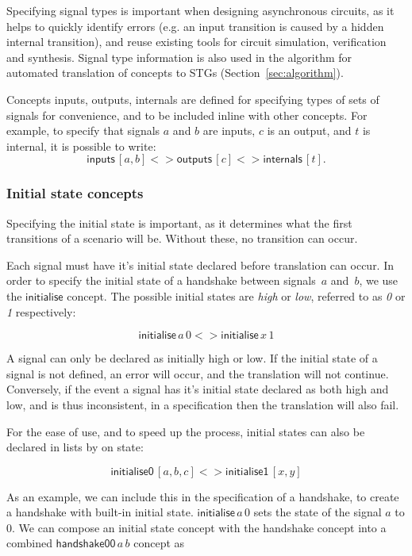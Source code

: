 \documentclass[british,conference,compsoc]{IEEEtran}
\begin{document}
\noindent Specifying signal types is important when designing asynchronous
circuits, as it helps to quickly identify errors (e.g. an input transition is
caused by a hidden internal transition), and reuse existing tools for circuit
simulation, verification and synthesis. Signal type information is also used
in the algorithm for automated translation of concepts to
STGs (Section~\ref{sec:algorithm}).

Concepts \textsf{inputs}, \textsf{outputs}, \textsf{internals} are defined for
specifying types of sets of signals for convenience, and to be included inline with other
concepts. For example, to specify
that signals $a$ and $b$ are inputs, $c$ is an output, and $t$ is internal, it
is possible to write:
\[
\mathsf{inputs}\,[a, b] <> \mathsf{outputs}\,[c] <>
\mathsf{internals}\,[t].
\]


\subsubsection{Initial state concepts\label{sub:initState}}

Specifying the initial state is important, as it determines what the first transitions
of a scenario will be. Without these, no transition can occur.

Each signal must have it's initial state declared before translation can occur. 
In order to specify the initial state of a handshake between signals~$a$
and~$b$, we use the $\mathsf{initialise}$ concept.
The possible initial states are \emph{high} or \emph{low}, referred to as \emph{0} 
or \emph{1} respectively:

\[
\mathsf{initialise}\,a\,0 <> \mathsf{initialise}\,x\, 1
\]

\noindent A signal can only be declared as initially high or low. If the initial state of a signal is 
not defined, an error will occur, and the translation will not continue. Conversely, 
if the event a signal has it's initial state declared as both high and low,
and is thus inconsistent, in a specification then the translation will also fail.

For the ease of use, and to speed up the process, initial states can also be declared
in lists by on state:

\[
\mathsf{initialise0}\, [a, b, c] <> \mathsf{initialise1}\, [x, y]
\]


\noindent As an example, we can include this in the specification of a handshake, to 
create a handshake with built-in initial state.
$\mathsf{initialise}\,a\, 0$ sets the state of the signal
$a$ to $0$. We can compose an initial state concept with the handshake concept
into a combined $\mathsf{handshake00}\,a\, b$ concept as
\end{document}
